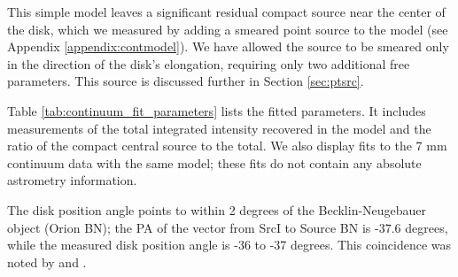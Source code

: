 \documentclass[twocolumn]{aastex61}
\newcommand{\sourcei}{SrcI\xspace}
\begin{document}
This simple model leaves a significant residual compact source near the center
of the disk, which we measured by adding a smeared point source to the model
(see Appendix \ref{appendix:contmodel}).  We have allowed the source to be
smeared only in the direction of the disk's elongation, requiring only two
additional free parameters.  This source is discussed further in Section
\ref{sec:ptsrc}.

Table \ref{tab:continuum_fit_parameters} lists the fitted parameters.  It 
includes measurements of the total integrated intensity recovered in the model
and the ratio of the compact central source to the total.  We also display
fits to the \citet{Reid2007a} 7 mm continuum data with the same model;
these fits do not contain any absolute astrometry information.




The disk position angle points to within 2 degrees of the Becklin-Neugebauer
object (Orion BN); the PA of the vector from \sourcei to Source BN is -37.6
degrees, while the measured disk position angle is -36 to -37 degrees.
This coincidence was noted by \citet{Bally2011a} and \citet{Goddi2011b}.

\end{document}
